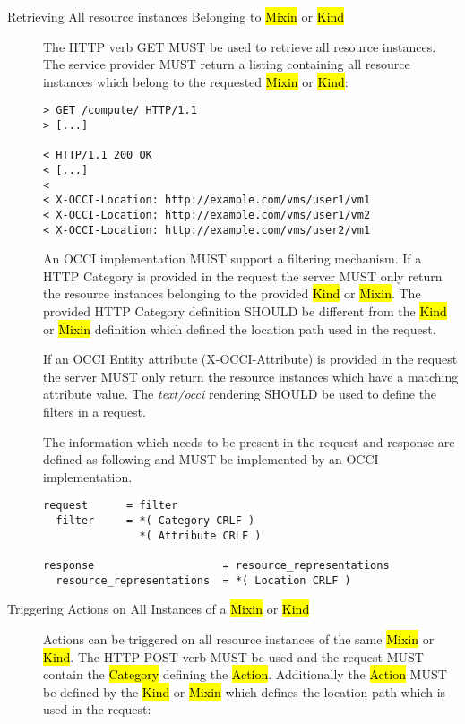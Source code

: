 \documentclass[10pt,a4paper]{article}
\begin{document}
\begin{description}
  \item[Retrieving All resource instances Belonging to \hl{Mixin} or
    \hl{Kind}] The HTTP verb GET MUST be used to retrieve all resource
    instances. The service provider MUST return a listing containing
    all resource instances which belong to the requested \hl{Mixin} or
    \hl{Kind}:

\begin{verbatim}
> GET /compute/ HTTP/1.1
> [...]
 
< HTTP/1.1 200 OK
< [...]
< 
< X-OCCI-Location: http://example.com/vms/user1/vm1
< X-OCCI-Location: http://example.com/vms/user1/vm2
< X-OCCI-Location: http://example.com/vms/user2/vm1
\end{verbatim}

    An OCCI implementation MUST support a filtering mechanism. If a
    HTTP Category is provided in the request the server MUST only
    return the resource instances belonging to the provided \hl{Kind}
    or \hl{Mixin}. The provided HTTP Category definition SHOULD be
    different from the \hl{Kind} or \hl{Mixin} definition which
    defined the location path used in the request.

    If an OCCI Entity attribute (X-OCCI-Attribute) is provided in the
    request the server MUST only return the resource instances which
    have a matching attribute value. The \emph{text/occi} rendering
    SHOULD be used to define the filters in a request.

    The information which needs to be present in the request and
    response are defined as following and MUST be implemented by an
    OCCI implementation.

\begin{verbatim}
request      = filter
  filter     = *( Category CRLF )
               *( Attribute CRLF )

response                    = resource_representations
  resource_representations  = *( Location CRLF ) 
\end{verbatim}

  \item[Triggering Actions on All Instances of a \hl{Mixin} or
    \hl{Kind}] Actions can be triggered on all resource instances of
    the same \hl{Mixin} or \hl{Kind}. The HTTP POST verb MUST be used
    and the request MUST contain the \hl{Category} defining the
    \hl{Action}.  Additionally the \hl{Action} MUST be defined by the
    \hl{Kind} or \hl{Mixin} which defines the location path which is
    used in the request:


\end{description}
\end{document}
